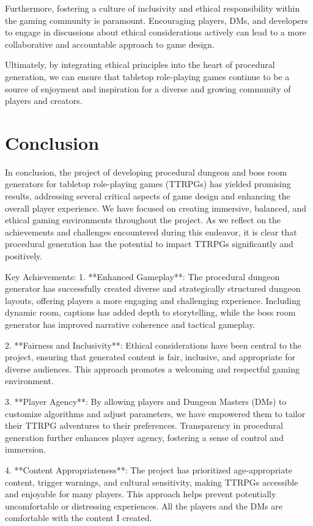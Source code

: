 \documentclass[10pt,twocolumn]{article}
\begin{document}
Furthermore, fostering a culture of inclusivity and ethical responsibility within the gaming community is paramount. Encouraging players, DMs, and developers to engage in discussions about ethical considerations actively can lead to a more collaborative and accountable approach to game design.

Ultimately, by integrating ethical principles into the heart of procedural generation, we can ensure that tabletop role-playing games continue to be a source of enjoyment and inspiration for a diverse and growing community of players and creators.
\section{Conclusion}

In conclusion, the project of developing procedural dungeon and boss room generators for tabletop role-playing games (TTRPGs) has yielded promising results, addressing several critical aspects of game design and enhancing the overall player experience. We have focused on creating immersive, balanced, and ethical gaming environments throughout the project. As we reflect on the achievements and challenges encountered during this endeavor, it is clear that procedural generation has the potential to impact TTRPGs significantly and positively.

Key Achievements:
1. **Enhanced Gameplay**: The procedural dungeon generator has successfully created diverse and strategically structured dungeon layouts, offering players a more engaging and challenging experience. Including dynamic room, captions has added depth to storytelling, while the boss room generator has improved narrative coherence and tactical gameplay.

2. **Fairness and Inclusivity**: Ethical considerations have been central to the project, ensuring that generated content is fair, inclusive, and appropriate for diverse audiences. This approach promotes a welcoming and respectful gaming environment.

3. **Player Agency**: By allowing players and Dungeon Masters (DMs) to customize algorithms and adjust parameters, we have empowered them to tailor their TTRPG adventures to their preferences. Transparency in procedural generation further enhances player agency, fostering a sense of control and immersion.

4. **Content Appropriateness**: The project has prioritized age-appropriate content, trigger warnings, and cultural sensitivity, making TTRPGs accessible and enjoyable for many players. This approach helps prevent potentially uncomfortable or distressing experiences. All the players and the DMs are comfortable with the content I created.
\end{document}
